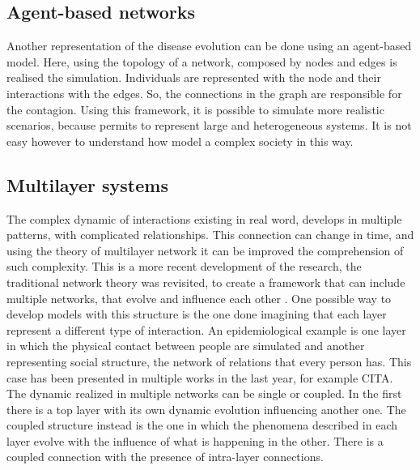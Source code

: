 \subsection{Agent-based networks}
Another representation of the disease evolution can be done using an agent-based model. Here, using the topology of a network, composed by nodes and edges is realised the simulation. Individuals are represented with the node and their interactions with the edges. So, the connections in the graph are responsible for the contagion. Using this framework, it is possible to simulate more realistic scenarios, because permits to represent large and heterogeneous systems. It is not easy however to understand how model a complex society in this way.  

\subsection{Multilayer systems}

The complex dynamic of interactions existing in real word, develops in multiple patterns, with complicated relationships. This connection can change in time, and using the theory of multilayer network it can be improved the comprehension of such complexity. This is a more recent development of the research, the traditional network theory was revisited, to create a framework that can include multiple networks, that evolve and influence each other \cite{DeDomenico2016}. 
One possible way to develop models with this structure is the one done imagining that each layer represent a different type of interaction. An epidemiological example is one layer in which the physical contact between people are simulated and another representing social structure, the network of relations that every person has. This case has been presented in multiple works in the last year, for example CITA. 
The dynamic realized in multiple networks can be single or coupled. In the first there is a top layer with its own dynamic evolution influencing another one. The coupled structure instead is the one in which the phenomena described in each layer evolve with the influence of what is happening in the other. There is a coupled connection with the presence of intra-layer connections.




